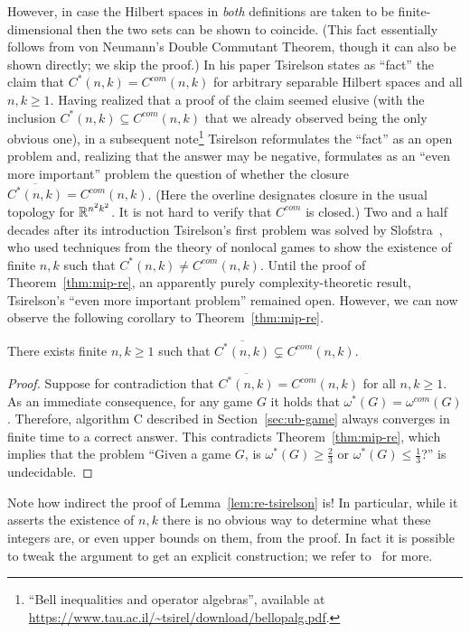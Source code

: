 However, in case the Hilbert spaces in \emph{both} definitions are taken to be finite-dimensional then the two sets can be shown to coincide. (This fact essentially follows from von Neumann's Double Commutant Theorem, though it can also be shown directly; we skip the proof.)
In his paper Tsirelson states as ``fact'' the claim that $C^*(n,k)=C^{com}(n,k)$ for arbitrary separable Hilbert spaces and all $n,k\geq 1$. Having realized that a proof of the claim seemed elusive (with the inclusion $C^*(n,k)\subseteq C^{com}(n,k)$ that we already observed being the only obvious one), in a subsequent note\footnote{``Bell inequalities and operator algebras'', available at \url{https://www.tau.ac.il/~tsirel/download/bellopalg.pdf}.} Tsirelson reformulates the ``fact'' as an open problem and, realizing that the answer may be negative, formulates as an ``even more important'' problem the question of whether the closure $\overline{C^*(n,k)}=C^{com}(n,k)$. (Here the overline designates closure in the usual topology for $\mathbb{R}^{n^2k^2}$. It is not hard to verify that $C^{com}$ is closed.) Two and a half decades after its introduction Tsirelson's first problem was solved by Slofstra~\cite{slofstra2019set}, who used techniques from the theory of nonlocal games to show the existence of finite $n,k$ such that $C^*(n,k)\neq C^{com}(n,k)$. Until the proof of Theorem~\ref{thm:mip-re}, an apparently purely complexity-theoretic result, Tsirelson's ``even more important problem'' remained open. However, we can now observe the following corollary to Theorem~\ref{thm:mip-re}. 

\begin{corollary}\label{lem:re-tsirelson}
There exists finite $n,k\geq 1$ such that  $\overline{C^*(n,k)}\subsetneq C^{com}(n,k)$. 
\end{corollary} 

\begin{proof}
Suppose for contradiction that $\overline{C^*(n,k)}= C^{com}(n,k)$ for all $n,k\geq 1$. As an immediate consequence, for any game $G$ it holds that $\omega^*(G) = \omega^{com}(G)$. Therefore, algorithm C described in Section~\ref{sec:ub-game} always converges in finite time to a correct answer. This contradicts Theorem~\ref{thm:mip-re}, which implies that the problem ``Given a game $G$, is $\omega^*(G) \geq \frac{2}{3}$ or $\omega^*(G) \leq \frac{1}{3}$?'' is undecidable.
\end{proof}

Note how indirect the proof of Lemma~\ref{lem:re-tsirelson} is! In particular, while it asserts the existence of $n,k$ there is no obvious way to determine what these integers are, or even upper bounds on them, from the proof. In fact it is possible to tweak the argument to get an explicit construction; we refer to~\cite{ji2020mip} for more. 


